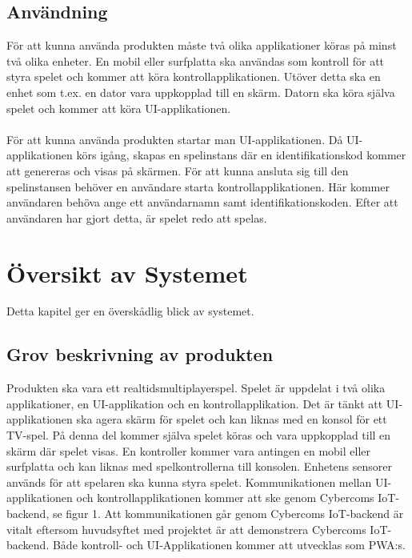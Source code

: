 \documentclass[10pt]{article}
\begin{document}
	\subsection{Användning}
		För att kunna använda produkten måste två olika applikationer köras på minst två olika enheter. En mobil eller surfplatta ska användas som kontroll för att styra spelet och kommer att köra kontrollapplikationen. Utöver detta ska en enhet som t.ex. en dator vara uppkopplad till en skärm. Datorn ska köra själva spelet och kommer att köra UI-applikationen. \\
\\
För att kunna använda produkten startar man UI-applikationen. Då UI-applikationen körs igång, skapas en spelinstans där en identifikationskod kommer att genereras och visas på skärmen. För att kunna ansluta sig till den spelinstansen behöver en användare starta kontrollapplikationen. Här kommer användaren behöva ange ett användarnamn samt identifikationskoden. Efter att användaren har gjort detta, är spelet redo att spelas.

		
\pagebreak
\section{Översikt av Systemet}
	Detta kapitel ger en överskådlig blick av systemet.

	\subsection{Grov beskrivning av produkten}
	Produkten ska vara ett realtidsmultiplayerspel. Spelet är uppdelat i två olika applikationer, en UI-applikation och en kontrollapplikation. Det är tänkt att UI-applikationen ska agera skärm för spelet och kan liknas med en konsol för ett TV-spel. På denna del kommer själva spelet köras och vara uppkopplad till en skärm där spelet visas. En kontroller kommer vara antingen en mobil eller surfplatta och kan liknas med spelkontrollerna till konsolen. Enhetens sensorer används för att spelaren ska kunna styra spelet. Kommunikationen mellan UI-applikationen och kontrollapplikationen kommer att ske genom Cybercoms IoT-backend, se figur 1. Att kommunikationen går genom Cybercoms IoT-backend är vitalt eftersom huvudsyftet med projektet är att demonstrera Cybercoms IoT-backend.  Både kontroll- och UI-Applikationen kommer att utvecklas som PWA:s. 
	
\end{document}
